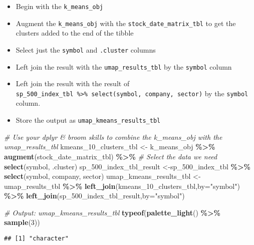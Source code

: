 \documentclass[
]{article}
\newenvironment{Shaded}{\begin{snugshade}}{\end{snugshade}}
\newcommand{\AttributeTok}[1]{\textcolor[rgb]{0.13,0.29,0.53}{#1}}
\newcommand{\CommentTok}[1]{\textcolor[rgb]{0.56,0.35,0.01}{\textit{#1}}}
\newcommand{\DecValTok}[1]{\textcolor[rgb]{0.00,0.00,0.81}{#1}}
\newcommand{\FunctionTok}[1]{\textcolor[rgb]{0.13,0.29,0.53}{\textbf{#1}}}
\newcommand{\NormalTok}[1]{#1}
\newcommand{\OtherTok}[1]{\textcolor[rgb]{0.56,0.35,0.01}{#1}}
\newcommand{\SpecialCharTok}[1]{\textcolor[rgb]{0.81,0.36,0.00}{\textbf{#1}}}
\newcommand{\StringTok}[1]{\textcolor[rgb]{0.31,0.60,0.02}{#1}}
\providecommand{\tightlist}{%
  \setlength{\itemsep}{0pt}\setlength{\parskip}{0pt}}
\begin{document}
\begin{itemize}
\tightlist
\item
  Begin with the \texttt{k\_means\_obj}
\item
  Augment the \texttt{k\_means\_obj} with the
  \texttt{stock\_date\_matrix\_tbl} to get the clusters added to the end
  of the tibble
\item
  Select just the \texttt{symbol} and \texttt{.cluster} columns
\item
  Left join the result with the \texttt{umap\_results\_tbl} by the
  \texttt{symbol} column
\item
  Left join the result with the result of
  \texttt{sp\_500\_index\_tbl\ \%\textgreater{}\%\ select(symbol,\ company,\ sector)}
  by the \texttt{symbol} column.
\item
  Store the output as \texttt{umap\_kmeans\_results\_tbl}
\end{itemize}

\begin{Shaded}
\begin{Highlighting}[]
\CommentTok{\# Use your dplyr \& broom skills to combine the k\_means\_obj with the umap\_results\_tbl}
\NormalTok{kmeans\_10\_clusters\_tbl }\OtherTok{\textless{}{-}}\NormalTok{ k\_means\_obj }\SpecialCharTok{\%\textgreater{}\%} 
    \FunctionTok{augment}\NormalTok{(stock\_date\_matrix\_tbl) }\SpecialCharTok{\%\textgreater{}\%}
    \CommentTok{\# Select the data we need}
    \FunctionTok{select}\NormalTok{(symbol, .cluster)}
\NormalTok{sp\_500\_index\_tbl\_result }\OtherTok{\textless{}{-}}\NormalTok{sp\_500\_index\_tbl }\SpecialCharTok{\%\textgreater{}\%} \FunctionTok{select}\NormalTok{(symbol, company, sector)}
\NormalTok{umap\_kmeans\_results\_tbl }\OtherTok{\textless{}{-}}\NormalTok{ umap\_results\_tbl }\SpecialCharTok{\%\textgreater{}\%}
    \FunctionTok{left\_join}\NormalTok{(kmeans\_10\_clusters\_tbl,}\AttributeTok{by=}\StringTok{"symbol"}\NormalTok{) }\SpecialCharTok{\%\textgreater{}\%}
    \FunctionTok{left\_join}\NormalTok{(sp\_500\_index\_tbl\_result,}\AttributeTok{by=}\StringTok{"symbol"}\NormalTok{)}

\CommentTok{\# Output: umap\_kmeans\_results\_tbl }
\FunctionTok{typeof}\NormalTok{(}\FunctionTok{palette\_light}\NormalTok{() }\SpecialCharTok{\%\textgreater{}\%} \FunctionTok{sample}\NormalTok{(}\DecValTok{3}\NormalTok{))}
\end{Highlighting}
\end{Shaded}

\begin{verbatim}
## [1] "character"
\end{verbatim}
\end{document}
